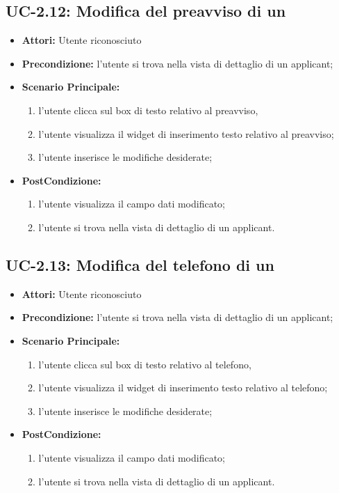 \subsection{UC-2.12: Modifica del preavviso di un \applicant}
\begin{itemize}
	\item \textbf{Attori:} Utente riconosciuto
	\item \textbf{Precondizione:}  l'utente si trova nella vista di dettaglio di un applicant;
	\item \textbf{Scenario Principale:}
	\begin{enumerate}
		\item l'utente clicca sul box di testo relativo al preavviso,
		\item l'utente visualizza il  widget di inserimento testo relativo al preavviso;
		\item l'utente inserisce le modifiche desiderate;
	\end{enumerate}
	\item \textbf{PostCondizione:} 
	\begin{enumerate}
		\item l'utente visualizza il campo dati modificato;
		\item l'utente si trova nella vista di dettaglio di un applicant.
	\end{enumerate}
	
\end{itemize}

\subsection{UC-2.13: Modifica del telefono di un \applicant}
\begin{itemize}
	\item \textbf{Attori:} Utente riconosciuto
	\item \textbf{Precondizione:}  l'utente si trova nella vista di dettaglio di un applicant;
	\item \textbf{Scenario Principale:}
	\begin{enumerate}
		\item l'utente clicca sul box di testo relativo al telefono,
		\item l'utente visualizza il  widget di inserimento testo relativo al telefono;
		\item l'utente inserisce le modifiche desiderate;
	\end{enumerate}
	\item \textbf{PostCondizione:} 
	\begin{enumerate}
		\item l'utente visualizza il campo dati modificato;
		\item l'utente si trova nella vista di dettaglio di un applicant.
	\end{enumerate}
	
\end{itemize}


